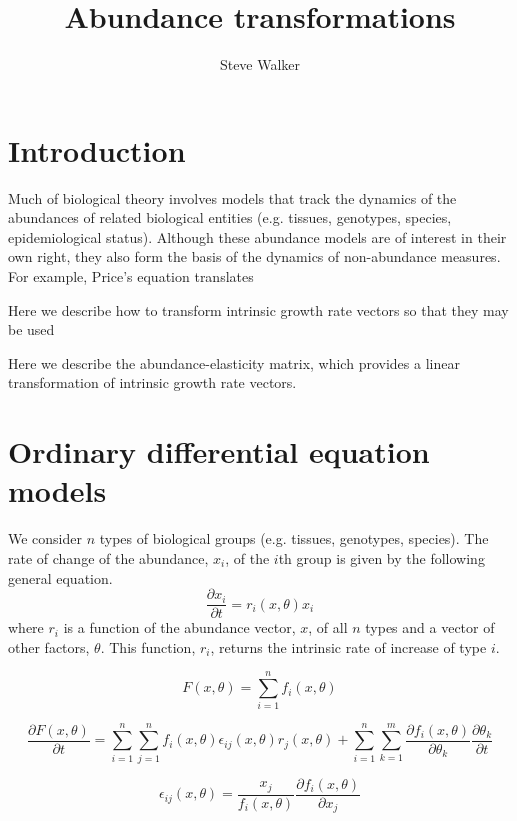\documentclass{article}
\title{Abundance transformations}
\author{Steve Walker}
\begin{document}
\maketitle

\section{Introduction}

Much of biological theory involves models that track the dynamics of the abundances of related biological entities (e.g. tissues, genotypes, species, epidemiological status).  Although these abundance models are of interest in their own right, they also form the basis of the dynamics of non-abundance measures.  For example, Price's equation translates 

Here we describe how to transform intrinsic growth rate vectors so that they may be used 

Here we describe the abundance-elasticity matrix, which provides a linear transformation of intrinsic growth rate vectors.  

\section{Ordinary differential equation models}

We consider $n$ types of biological groups (e.g. tissues, genotypes, species).  The rate of change of the abundance, $x_i$, of the $i$th group is given by the following general equation.
\begin{equation}
\frac{\partial x_i}{\partial t} = r_i(x, \theta) x_i
\end{equation}
where $r_i$ is a function of the abundance vector, $x$, of all $n$ types and a vector of other factors, $\theta$.  This function, $r_i$, returns the intrinsic rate of increase of type $i$.



\begin{equation}
F(x, \theta) = \sum_{i = 1}^n f_i(x, \theta)
\end{equation}

\begin{equation}
\frac{\partial F(x, \theta)}{\partial t} = 
\sum_{i = 1}^n \sum_{j = 1}^n
f_i(x, \theta)\epsilon_{ij}(x, \theta)r_j(x, \theta)
+ 
\sum_{i = 1}^n\sum_{k = 1}^m
\frac{\partial f_i(x, \theta)}{\partial \theta_k}
\frac{\partial \theta_k}{\partial t}
\end{equation}

\begin{equation}
\epsilon_{ij}(x, \theta) = 
\frac{x_j}{f_i(x, \theta)}
\frac{\partial f_i(x, \theta)}{\partial x_j}
\end{equation}
\end{document}
